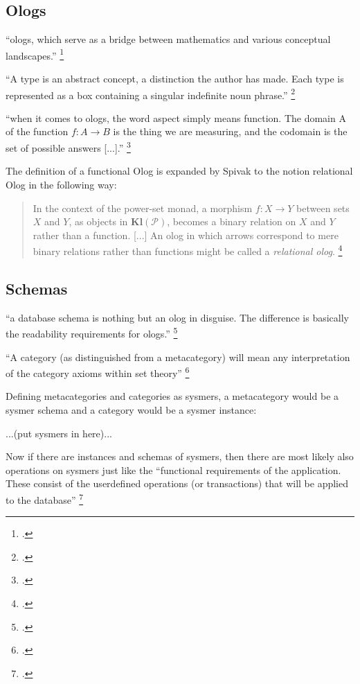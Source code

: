 \documentclass[12pt,a4paper]{article}
\begin{document}
\subsection{Ologs}
``ologs, which serve as a bridge between mathematics and various conceptual landscapes.'' \footcite[24]{Spivak2014}

``A type is an abstract concept, a distinction the author has made. Each type is represented as a box containing a singular indefinite noun phrase.'' \footcite[25]{Spivak2014}

``when it comes to ologs, the word aspect simply means function. The domain A of the function \( f: A \to B \) is the thing we are measuring, and the codomain is the set of possible answers [...].'' \footcite[27]{Spivak2014}

The definition of a functional Olog is expanded by Spivak to the notion relational Olog in the following way:
\begin{quote}
In the context of the power-set monad, a morphism \( f: X \to Y \) between sets \( X \) and \( Y \), as objects in \( \textbf{Kl}(\mathcal{P}) \), becomes a binary relation on \( X \) and \( Y \) rather than a function. [...] An olog in which arrows correspond to mere binary relations rather than functions might 
be called a \textit{relational olog}. \footcite[447]{Spivak2014}
\end{quote}

\subsection{Schemas}
``a database schema is nothing but an olog in disguise. The diﬀerence is basically the readability requirements for ologs.'' \footcite[194]{Spivak2014}

``A category (as distinguished from a metacategory) will mean any interpretation of the category axioms within set theory'' \footcite[10]{MacLane1997}

Defining metacategories and categories as sysmers, a metacategory would be a sysmer schema and a category would be a sysmer instance:

...(put sysmers in here)...

Now if there are instances and schemas of sysmers, then there are most likely also operations on sysmers just like the ``functional requirements of the application. These consist of the userdefined operations (or transactions) that will be applied to the database'' \footcite[61]{ElmasriNavathe2015}
\end{document}
